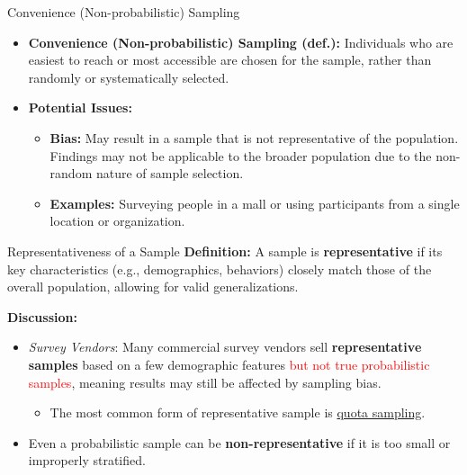 \documentclass[handout]{beamer} %
\begin{document}
\begin{frame}{Convenience (Non-probabilistic) Sampling}

    \begin{itemize}
        \item \textbf{Convenience (Non-probabilistic) Sampling (def.):} Individuals who are easiest to reach or most accessible are chosen for the sample, rather than randomly or systematically selected.
        \item \textbf{Potential Issues:} 
        \begin{itemize}
            \item \textbf{Bias:} May result in a sample that is not representative of the population. Findings may not be applicable to the broader population due to the non-random nature of sample selection.
            \item \textbf{Examples:} Surveying people in a mall or using participants from a single location or organization.
        \end{itemize}
    \end{itemize}
\end{frame}

\begin{frame}{Representativeness of a Sample}
    \textbf{Definition:}  
    A sample is \textbf{representative} if its key characteristics (e.g., demographics, behaviors) closely match those of the overall population, allowing for valid generalizations.  
    \newline  \pause %
    
    \textbf{Discussion:}  
    \begin{itemize}
        \item \emph{Survey Vendors}:
        Many commercial survey vendors sell \textbf{representative samples} based on a few demographic features  
        \textcolor{red}{ but not true probabilistic samples}, meaning results may still be affected by sampling bias.
        \begin{itemize}
            \item The most common form of representative sample is \href{https://dictionary.apa.org/quota-sampling}{quota sampling}. 
        \end{itemize}  \pause %
        \item Even a probabilistic sample can be \textbf{non-representative} if it is too small or improperly stratified.
    \end{itemize}

\end{frame}
\end{document}
